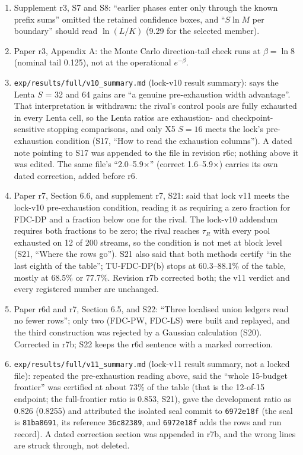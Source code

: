 \documentclass[sigconf,anonymous,review]{acmart}
\begin{document}
\begin{enumerate}
\item Supplement r3, S7 and S8: ``earlier phases enter only through the known prefix sums'' omitted the retained confidence boxes, and ``$S\ln M$ per boundary'' should read $\ln(L/K)$ (9.29 for the selected member).
\item Paper r3, Appendix A: the Monte Carlo direction-tail check runs at $\beta = \ln 8$ (nominal tail 0.125), not at the operational $e^{-\beta}$.
\item \texttt{exp/results/full/v10\_summary.md} (lock-v10 result summary): says the Lenta $S$ = 32 and 64 gains are ``a genuine pre-exhaustion width advantage''. That interpretation is withdrawn: the rival's control pools are fully exhausted in every Lenta cell, so the Lenta ratios are exhaustion- and checkpoint-sensitive stopping comparisons, and only X5 $S = 16$ meets the lock's pre-exhaustion condition (S17, ``How to read the exhaustion columns''). A dated note pointing to S17 was appended to the file in revision r6c; nothing above it was edited. The same file's ``2.0--5.9$\times$'' (correct 1.6--5.9$\times$) carries its own dated correction, added before r6.
\item Paper r7, Section 6.6, and supplement r7, S21: said that lock v11 meets the lock-v10 pre-exhaustion condition, reading it as requiring a zero fraction for FDC-DP and a fraction below one for the rival. The lock-v10 addendum requires both fractions to be zero; the rival reaches $\tau_R$ with every pool exhausted on 12 of 200 streams, so the condition is not met at block level (S21, ``Where the rows go''). S21 also said that both methods certify ``in the last eighth of the table''; TU-FDC-DP(b) stops at 60.3--88.1\% of the table, mostly at 68.5\% or 77.7\%. Revision r7b corrected both; the v11 verdict and every registered number are unchanged.
\item Paper r6d and r7, Section 6.5, and S22: ``Three localised union ledgers read no fewer rows''; only two (FDC-PW, FDC-LS) were built and replayed, and the third construction was rejected by a Gaussian calculation (S20). Corrected in r7b; S22 keeps the r6d sentence with a marked correction.
\item \texttt{exp/results/full/v11\_summary.md} (lock-v11 result summary, not a locked file): repeated the pre-exhaustion reading above, said the ``whole 15-budget frontier'' was certified at about 73\% of the table (that is the 12-of-15 endpoint; the full-frontier ratio is 0.853, S21), gave the development ratio as 0.826 (0.8255) and attributed the isolated seal commit to \texttt{6972e18f} (the seal is \texttt{81ba8691}, its reference \texttt{36c82389}, and \texttt{6972e18f} adds the rows and run record). A dated correction section was appended in r7b, and the wrong lines are struck through, not deleted.

\end{enumerate}
\end{document}

